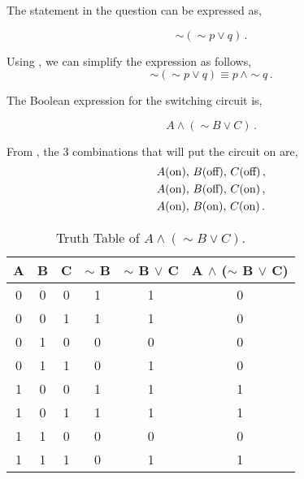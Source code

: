 \begin{subquestions}
\begin{subsubquestions}
The statement in the question can be expressed as,

\begin{equation}
	\sim(\sim p \lor q)\,.
\end{equation}


\subsubquestion

Using , we can simplify the expression as follows,
\begin{equation}
		\sim(\sim p \lor q) \equiv p \, \land \sim q\,.
\end{equation}

\end{subsubquestions}


\subquestion

\begin{subsubquestions}

\subsubquestion
The Boolean expression for the switching circuit is,

\begin{equation}
	A \land (\sim B \lor C)\,.
\end{equation}


\subsubquestion

From , the 3 combinations that will put the circuit on are,
\begin{align}
	& A (\text{on}),\, B (\text{off}),\, C (\text{off})\,, \nonumber \\
	& A (\text{on}),\, B (\text{off}),\, C (\text{on})\,, \nonumber \\
	& A (\text{on}),\, B (\text{on}),\, C (\text{on})\,.
\end{align}

\begin{table}[ht]
	\centering
	\begin{tabular}{|c|c|c|c|c|c|}
		\hline
		A & B & C & $\sim$ B & $\sim$ B $\lor$ C & A $\land$ ($\sim$ B $\lor$ C) \\
		\hline
		0 & 0 & 0 & 1 & 1 & 0 \\
		0 & 0 & 1 & 1 & 1 & 0 \\
		0 & 1 & 0 & 0 & 0 & 0 \\
		0 & 1 & 1 & 0 & 1 & 0 \\
		1 & 0 & 0 & 1 & 1 & 1 \\
		1 & 0 & 1 & 1 & 1 & 1 \\
		1 & 1 & 0 & 0 & 0 & 0 \\
		1 & 1 & 1 & 0 & 1 & 1 \\
		\hline
	\end{tabular}
	\caption{\label{2012:q2:TruthTab3} Truth Table of $A \land (\sim B \lor C)$.}
\end{table}


\end{subsubquestions}
\end{subquestions}
